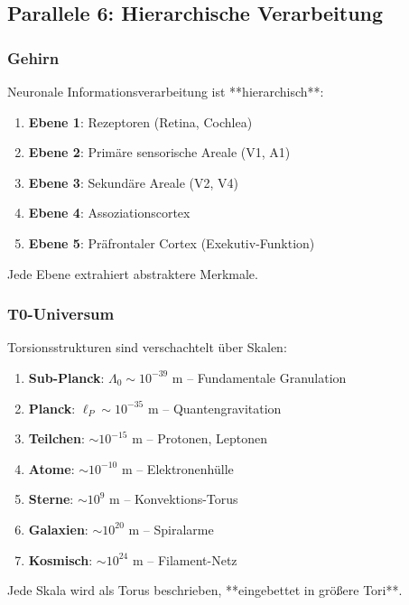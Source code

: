 	\subsection{Parallele 6: Hierarchische Verarbeitung}

	\subsubsection{Gehirn}

	Neuronale Informationsverarbeitung ist **hierarchisch**:

	\begin{enumerate}
		\item \textbf{Ebene 1}: Rezeptoren (Retina, Cochlea)
		\item \textbf{Ebene 2}: Primäre sensorische Areale (V1, A1)
		\item \textbf{Ebene 3}: Sekundäre Areale (V2, V4)
		\item \textbf{Ebene 4}: Assoziationscortex
		\item \textbf{Ebene 5}: Präfrontaler Cortex (Exekutiv-Funktion)
	\end{enumerate}

	Jede Ebene extrahiert abstraktere Merkmale.

	\subsubsection{T0-Universum}

	Torsionsstrukturen sind verschachtelt über Skalen:

	\begin{enumerate}
		\item \textbf{Sub-Planck}: $\Lambda_0 \sim 10^{-39}$ m -- Fundamentale Granulation
		\item \textbf{Planck}: $\ell_P \sim 10^{-35}$ m -- Quantengravitation
		\item \textbf{Teilchen}: $\sim 10^{-15}$ m -- Protonen, Leptonen
		\item \textbf{Atome}: $\sim 10^{-10}$ m -- Elektronenhülle
		\item \textbf{Sterne}: $\sim 10^9$ m -- Konvektions-Torus
		\item \textbf{Galaxien}: $\sim 10^{20}$ m -- Spiralarme
		\item \textbf{Kosmisch}: $\sim 10^{24}$ m -- Filament-Netz
	\end{enumerate}

	Jede Skala wird als Torus beschrieben, **eingebettet in größere Tori**.

